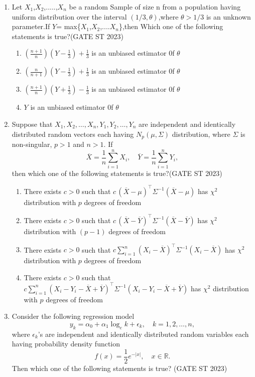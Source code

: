 \documentclass[journal]{IEEEtran}
\begin{document}
\begin{enumerate}[label=\textbf{Q.\arabic*.}, start=11, align=left, itemsep=2em]
\item Let $X_1$,$X_2$,.....,$X_n$ be a random Sample of size n from a population having uniform distribution over the interval $(1/3,\theta)$,where $\theta>1/3$ is an unknown parameter.If $Y$= max\{$X_1$,$X_2$,....$X_n$\},then Which one of the following statements is true?\hfill(GATE ST 2023)  
\begin{enumerate}
    \item $\left( \frac{n+1}{n} \right) (Y - \frac13) + \frac13$ is an unbiased estimator 0f $\theta$  
     \item $\left( \frac{n}{n+1} \right) (Y - \frac13) + \frac13$  is an unbiased estimator 0f $\theta$  
    \item $\left( \frac{n+1}{n} \right) (Y + \frac13) - \frac13$ is an unbiased estimator 0f $\theta$   
    \item $Y$ is an unbiased estimator 0f $\theta$  
\end{enumerate}

\item Suppose that $X_1, X_2, \dots, X_n, Y_1, Y_2, \dots, Y_n$ are independent and identically
distributed random vectors each having $N_p(\mu, \Sigma)$ distribution, where $\Sigma$ is non-singular, $p>1$ and $n>1$. 
If 
\[
\overline{X} = \frac{1}{n} \sum_{i=1}^n X_i, 
\quad
\overline{Y} = \frac{1}{n} \sum_{i=1}^n Y_i,
\]
then which one of the following statements is true?\hfill(GATE ST 2023)
\begin{enumerate}
    \item There exists $c>0$ such that $c\, (\overline{X} - \mu)^{\top} \Sigma^{-1} (\overline{X} - \mu)$ has $\chi^2$ distribution with $p$ degrees of freedom
    \item There exists $c>0$ such that $c\, (\overline{X} - \overline{Y})^{\top} \Sigma^{-1} (\overline{X} - \overline{Y})$ has $\chi^2$ distribution with $(p-1)$ degrees of freedom
    \item There exists $c>0$ such that $c \sum_{i=1}^n (X_i - \overline{X})^{\top} \Sigma^{-1} (X_i - \overline{X})$ has $\chi^2$ distribution with $p$ degrees of freedom
    \item There exists $c>0$ such that $c \sum_{i=1}^n (X_i - Y_i - \overline{X} + \overline{Y})^{\top} \Sigma^{-1} (X_i - Y_i - \overline{X} + \overline{Y})$ has $\chi^2$ distribution with $p$ degrees of freedom
\end{enumerate}

\item Consider the following regression model  
\[
y_k = \alpha_0 + \alpha_1 \log_e k + \epsilon_k, \quad k = 1, 2, \dots, n,
\]
where $\epsilon_k$'s are independent and identically distributed random variables each having probability density function  
\[
f(x) = \frac{1}{2} e^{-|x|}, \quad x \in \mathbb{R}.
\]
Then which one of the following statements is true? \hfill(GATE ST 2023) 


\end{enumerate}
\end{document}
